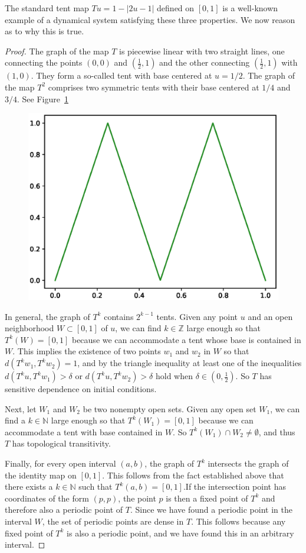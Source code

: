\begin{Example}\label{ex_standardTentMap}\rm
  The standard tent map $Tu=1-|2u-1|$ defined on $[0,1]$ is a well-known example of a dynamical system satisfying these three properties.  We now reason as to why this is true. 
  
  \begin{proof}
    The graph of the map $T$ is piecewise linear with two straight lines, one connecting the points $(0,0)$ and $(\frac{1}{2},1)$ and the other connecting $(\frac{1}{2},1)$ with $(1,0)$. They form a so-called tent with base centered at $u=1/2$. The graph of the map $T^2$ comprises two symmetric tents with their base centered at $1/4$ and $3/4$. See Figure~\ref{fig:T2tentmap}

    \begin{figure}[ht]
      \includegraphics[width=0.5\linewidth]{Graphs/_tentmap_2.eps}
          \centering
          \label{fig:T2tentmap}
    \end{figure}
    
    In general, the graph of  $T^k$ contains $2^{k-1}$ tents.
    Given any point $u$ and an open neighborhood $W \subset[0,1]$ of $u$, we can find $k\in\mathbb{Z}$ large enough so that $T^k(W) = [0,1]$ because we can accommodate a tent whose base is contained in $W$.
    This implies the existence of two points $w_1$ and $w_2$ in $W$ so that $d(T^kw_1,T^kw_2)= 1$, and by the triangle inequality  at least one of the inequalities $d(T^ku,T^kw_1)> \delta$ or $d(T^ku,T^kw_2)> \delta$ hold when $\delta\in (0,\frac{1}{2})$.  So $T$ has sensitive dependence on initial conditions.
    
    Next, let $W_1$ and $W_2$ be two nonempty open sets. Given any open set $W_1$, we can find a $k\in\mathbb{N}$ large enough so that $T^k(W_1) = [0,1]$ because we can accommodate a tent with base contained in $W$. So $T^k(W_1) \cap W_2 \not=\emptyset$, and thus $T$ has topological transitivity.
    
    Finally, for every open interval $(a,b)$, the graph of $T^k$ intersects the graph of the identity map on $[0,1]$. This follows from the fact established above that there exists a $k\in\mathbb{N}$ such that $T^k(a,b) = [0,1]$.If the intersection point has coordinates of the form $(p,p)$, the point $p$ is then a fixed point of $T^k$ and therefore also a periodic point of $T$. Since we have found a periodic point in the interval $W$,  the set of periodic points are dense in $T$.
    This follows because any fixed point of $T^k$ is also a periodic point, and we have found this in an arbitrary interval.
  \end{proof}
\end{Example}

